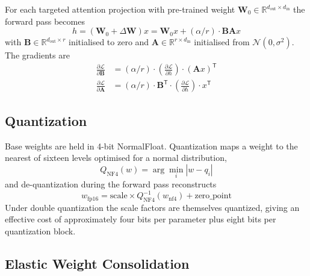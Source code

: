 \documentclass[12pt,a4paper]{report}
\begin{document}
For each targeted attention projection with pre-trained weight $\mathbf{W}_0 \in \mathbb{R}^{d_{\text{out}} \times d_{\text{in}}}$ the forward pass becomes
\begin{equation}
h = (\mathbf{W}_0 + \Delta\mathbf{W})x = \mathbf{W}_0 x + (\alpha/r) \cdot \mathbf{BA}x
\end{equation}
with $\mathbf{B} \in \mathbb{R}^{d_{\text{out}} \times r}$ initialised to zero and $\mathbf{A} \in \mathbb{R}^{r \times d_{\text{in}}}$ initialised from $\mathcal{N}(0, \sigma^2)$. The gradients are
\begin{align}
\frac{\partial \mathcal{L}}{\partial \mathbf{B}} &= (\alpha/r) \cdot \left(\frac{\partial \mathcal{L}}{\partial h}\right) \cdot (\mathbf{A}x)^{\mathsf{T}} \\
\frac{\partial \mathcal{L}}{\partial \mathbf{A}} &= (\alpha/r) \cdot \mathbf{B}^{\mathsf{T}} \cdot \left(\frac{\partial \mathcal{L}}{\partial h}\right) \cdot x^{\mathsf{T}}
\end{align}

\subsection{Quantization}

Base weights are held in 4-bit NormalFloat. Quantization maps a weight to the nearest of sixteen levels optimised for a normal distribution,
\begin{equation}
Q_{\text{NF4}}(w) = \arg\min_i |w - q_i|
\end{equation}
and de-quantization during the forward pass reconstructs
\begin{equation}
w_{\text{fp16}} = \text{scale} \times Q_{\text{NF4}}^{-1}(w_{\text{nf4}}) + \text{zero\_point}
\end{equation}
Under double quantization the scale factors are themselves quantized, giving an effective cost of approximately four bits per parameter plus eight bits per quantization block.

\subsection{Elastic Weight Consolidation}
\end{document}
